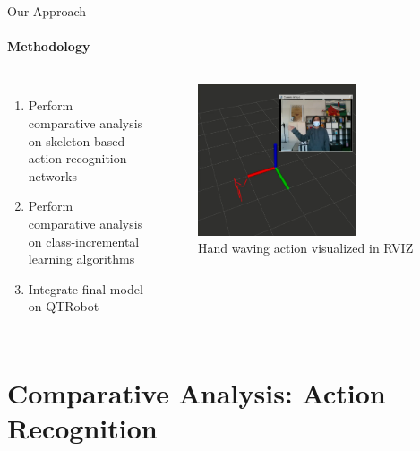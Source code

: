 \documentclass[aspectratio=169, xcolor=dvipsnames]{beamer}
\begin{document}
\begin{frame}{Our Approach}
      \framesubtitle{Methodology}%
      
      \begin{columns}
      \vspace{-0.75cm}
      \begin{enumerate}
              \item Perform comparative analysis on skeleton-based action recognition networks
              \item Perform comparative analysis on class-incremental learning algorithms
              \item Integrate final model on QTRobot
      \end{enumerate}
      
      \begin{figure}[ht!]
            \centering
            \includegraphics[width=0.7\textwidth]{images/waving_action_recognition.png}
            \caption{Hand waving action visualized in RVIZ}
      \end{figure}   
      \end{columns}
\end{frame}

\section{Comparative Analysis: Action Recognition}
\end{document}
